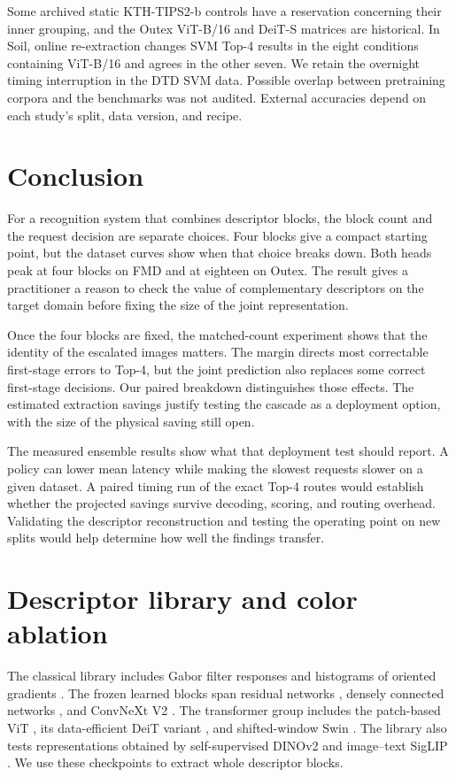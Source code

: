 \documentclass[10pt,a4paper,fleqn]{article}
\begin{document}
Some archived static KTH-TIPS2-b controls have a reservation concerning their inner grouping, and the Outex ViT-B/16 and DeiT-S matrices are historical. In Soil, online re-extraction changes SVM Top-4 results in the eight conditions containing ViT-B/16 and agrees in the other seven. We retain the overnight timing interruption in the DTD SVM data. Possible overlap between pretraining corpora and the benchmarks was not audited. External accuracies depend on each study's split, data version, and recipe.

\section{Conclusion}

For a recognition system that combines descriptor blocks, the block count and the request decision are separate choices. Four blocks give a compact starting point, but the dataset curves show when that choice breaks down. Both heads peak at four blocks on FMD and at eighteen on Outex. The result gives a practitioner a reason to check the value of complementary descriptors on the target domain before fixing the size of the joint representation.

Once the four blocks are fixed, the matched-count experiment shows that the identity of the escalated images matters. The margin directs most correctable first-stage errors to Top-4, but the joint prediction also replaces some correct first-stage decisions. Our paired breakdown distinguishes those effects. The estimated extraction savings justify testing the cascade as a deployment option, with the size of the physical saving still open.

The measured ensemble results show what that deployment test should report. A policy can lower mean latency while making the slowest requests slower on a given dataset. A paired timing run of the exact Top-4 routes would establish whether the projected savings survive decoding, scoring, and routing overhead. Validating the descriptor reconstruction and testing the operating point on new splits would help determine how well the findings transfer.

\appendix
{}
\section{Descriptor library and color ablation}

The classical library includes Gabor filter responses \citep{jain1991gabor} and histograms of oriented gradients \citep{dalal2005hog}. The frozen learned blocks span residual networks \citep{he2016resnet}, densely connected networks \citep{huang2017densenet}, and ConvNeXt V2 \citep{woo2023convnextv2}. The transformer group includes the patch-based ViT \citep{dosovitskiy2021vit}, its data-efficient DeiT variant \citep{touvron2021deit}, and shifted-window Swin \citep{liu2021swin}. The library also tests representations obtained by self-supervised DINOv2 \citep{oquab2024dinov2} and image--text SigLIP \citep{zhai2023siglip}. We use these checkpoints to extract whole descriptor blocks.
\end{document}

